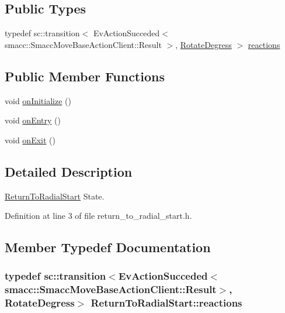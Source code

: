 \subsection*{Public Types}
\begin{DoxyCompactItemize}
\item 
typedef sc\+::transition$<$ Ev\+Action\+Succeded$<$ smacc\+::\+Smacc\+Move\+Base\+Action\+Client\+::\+Result $>$, \hyperlink{structRotateDegress}{Rotate\+Degress} $>$ \hyperlink{structReturnToRadialStart_a716132de4cdccabf7f8ddae62894aabd}{reactions}
\end{DoxyCompactItemize}
\subsection*{Public Member Functions}
\begin{DoxyCompactItemize}
\item 
void \hyperlink{structReturnToRadialStart_aa1e62a03313a3132fc201af382cdea5f}{on\+Initialize} ()
\item 
void \hyperlink{structReturnToRadialStart_a524c55eba08e84b906c016c8b2cac33c}{on\+Entry} ()
\item 
void \hyperlink{structReturnToRadialStart_ad03685768718e9f843f44c804dd5034c}{on\+Exit} ()
\end{DoxyCompactItemize}


\subsection{Detailed Description}
\hyperlink{structReturnToRadialStart}{Return\+To\+Radial\+Start} State. 

Definition at line 3 of file return\+\_\+to\+\_\+radial\+\_\+start.\+h.



\subsection{Member Typedef Documentation}
\subsubsection[{\texorpdfstring{reactions}{reactions}}]{\setlength{\rightskip}{0pt plus 5cm}typedef sc\+::transition$<$Ev\+Action\+Succeded$<$smacc\+::\+Smacc\+Move\+Base\+Action\+Client\+::\+Result$>$, {\bf Rotate\+Degress}$>$ {\bf Return\+To\+Radial\+Start\+::reactions}}\hypertarget{structReturnToRadialStart_a716132de4cdccabf7f8ddae62894aabd}{}\label{structReturnToRadialStart_a716132de4cdccabf7f8ddae62894aabd}


